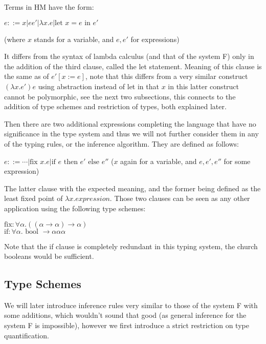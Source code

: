 Terms in HM have the form:

$e ::= x | e e' | \lambda x . e | \text{let } x = e \text{ in } e'$

(where $x$ stands for a variable, and $e, e'$ for expressions)

It differs from the syntax of lambda calculus (and that of the system F) only in the addition of the third clause, called the let statement. Meaning of this clause is the same as of $e' [x := e]$, note that this differs from a very similar construct $(\lambda x . e') e$ using abstraction instead of let in that $x$ in this latter construct cannot be polymorphic, see the next two subsections, this connects to the addition of type schemes and restriction of types, both explained later. %

Then there are two additional expressions completing the language that have no significance in the type system and thus we will not further consider them in any of the typing rules, or the inference algorithm. They are defined as follows: %

$e ::= \cdots | \text{fix } x . e | \text{if } e \text{ then } e' \text{ else } e''$
($x$ again for a variable, and $e, e', e''$ for some expression)

The latter clause with the expected meaning, and the former being defined as the least fixed point of $\lambda x . expression$. Those two clauses can be seen as any other application using the following type schemes:

$\text{fix}: \forall \alpha . ((\alpha \rightarrow \alpha) \rightarrow \alpha)$ \\
$\text{if}: \forall \alpha . \text{ bool } \rightarrow \alpha \alpha \alpha$

Note that the if clause is completely redundant in this typing system, the church booleans would be sufficient. %


\subsection{Type Schemes}

We will later introduce inference rules very similar to those of the system F with some additions, which wouldn't sound that good (as general inference for the system F is impossible), however we first introduce a strict restriction on type quantification.

